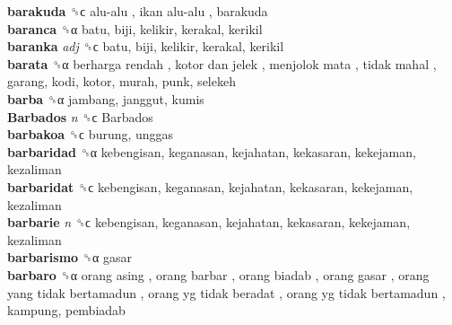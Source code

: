 \textbf{barakuda} ␝ϲ   alu-alu ,  ikan alu-alu , barakuda  \\
\textbf{baranca} ␝α  batu, biji, kelikir, kerakal, kerikil  \\
\textbf{baranka} \emph{adj}  ␝ϲ  batu, biji, kelikir, kerakal, kerikil  \\
\textbf{barata} ␝α   berharga rendah ,  kotor dan jelek ,  menjolok mata ,  tidak mahal , garang, kodi, kotor, murah, punk, selekeh  \\
\textbf{barba} ␝α  jambang, janggut, kumis  \\
\textbf{Barbados} \emph{n}  ␝ϲ   Barbados   \\
\textbf{barbakoa} ␝ϲ  burung, unggas  \\
\textbf{barbaridad} ␝α  kebengisan, keganasan, kejahatan, kekasaran, kekejaman, kezaliman  \\
\textbf{barbaridat} ␝ϲ  kebengisan, keganasan, kejahatan, kekasaran, kekejaman, kezaliman  \\
\textbf{barbarie} \emph{n}  ␝ϲ  kebengisan, keganasan, kejahatan, kekasaran, kekejaman, kezaliman  \\
\textbf{barbarismo} ␝α  gasar  \\
\textbf{barbaro} ␝α   orang asing ,  orang barbar ,  orang biadab ,  orang gasar ,  orang yang tidak bertamadun ,  orang yg tidak beradat ,  orang yg tidak bertamadun , kampung, pembiadab  \\
